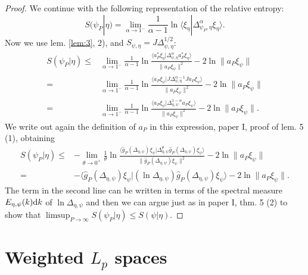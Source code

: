 \documentclass[english,a4paper,12pt]{article}
\newcommand{\ben}{\begin{equation}}
\newcommand{\een}{\end{equation}}
\newcommand{\dd}{{\rm d}}
\renewcommand{\log}{\operatorname{ln}}
\begin{document}
\begin{proof}
We continue with the following representation of the relative entropy:
\ben
S(\psi_P | \eta) = \lim_{\alpha \to 1^-} \frac{1}{\alpha-1} \log \langle \xi_\eta | \Delta^{\alpha}_{\psi_P,\eta} \xi_\eta \rangle. 
\een 
Now we use lem. \ref{lem:3}, 2), and $S_{\psi,\eta} = J \Delta_{\psi,\eta}^{1/2}$:
\ben
\begin{split}
S(\psi_P | \eta) 
\le& \lim_{\alpha \to 1^-} \frac{1}{\alpha-1} \log \frac{  \langle a_P^* \xi_\eta | \Delta^{\alpha}_{\psi,\eta} a_P^* \xi_\eta \rangle}{\|a_{P} \xi_\psi\|^2} 
-2 \log \|a_P \xi_\psi \| \\ 
=& \lim_{\alpha \to 1^-} \frac{1}{\alpha-1} \log \frac{  \langle a_P \xi_\psi | J \Delta^{\alpha-1}_{\psi,\eta} J a_P \xi_\psi \rangle}{\|a_{P} \xi_\psi\|^2} 
-2 \log \|a_P \xi_\psi \| \\ 
=& \lim_{\alpha \to 1^-} \frac{1}{\alpha-1} \log \frac{  \langle a_P \xi_\psi | \Delta^{1-\alpha}_{\eta,\psi}  a_P \xi_\psi \rangle}{\|a_{P} \xi_\psi\|^2} 
-2 \log \|a_P \xi_\psi \| . 
\end{split}
\een
We write out again the definition of $a_P$ in this expression, paper I, proof of lem. 5 (1), obtaining
\ben
\begin{split}
S(\psi_P | \eta) \le&-\lim_{\theta \to 0^+} \frac{1}{\theta} \log 
\frac{  \langle \hat g_P(\Delta_{\eta,\psi}) \xi_{\psi} | \Delta_{\eta,\psi}^{\theta} \hat g_P(\Delta_{\eta,\psi}) \xi_{\psi} \rangle}{\| \hat g_P(\Delta_{\eta,\psi}) \xi_{\psi}\|^2} 
-2 \log \|a_P \xi_\psi \| \\
=& -\langle \hat g_P(\Delta_{\eta,\psi}) \xi_{\psi} | (\log \Delta_{\eta,\psi}) \hat g_P(\Delta_{\eta,\psi}) \xi_{\psi} \rangle -2 \log \|a_P \xi_\psi \| . 
\end{split}
\een
The term in the second line can be written in terms of the spectral measure $E_{\eta,\psi}(k) \dd k$ of $\log \Delta_{\eta,\psi}$ and then we can argue just as in paper I, thm. 5 (2) to show that
$\limsup_{P \to \infty} S(\psi_P | \eta) \le S(\psi | \eta)$. 
\end{proof}

\section{Weighted $L_p$ spaces \cite{AM}} %
\end{document}
